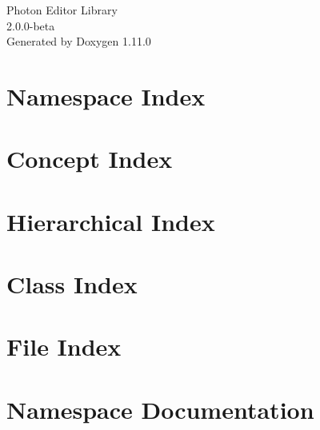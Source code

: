 \documentclass[twoside]{book}
\newcommand{\+}{\discretionary{\mbox{\scriptsize$\hookleftarrow$}}{}{}}
\newcommand{\clearemptydoublepage}{%
    \newpage{\pagestyle{empty}\cleardoublepage}%
  }
\begin{document}
  \raggedbottom
    \hypersetup{pageanchor=false,
                bookmarksnumbered=true,
                pdfencoding=unicode
               }
  \begin{titlepage}
  \vspace*{7cm}
  \begin{center}%
  {\Large Photon Editor Library}\\
  [1ex]\large 2.\+0.\+0-\/beta \\
  \vspace*{1cm}
  {\large Generated by Doxygen 1.11.0}\\
  \end{center}
  \end{titlepage}
  \clearemptydoublepage
  \tableofcontents
  \clearemptydoublepage
  \hypersetup{pageanchor=true}
\chapter{Namespace Index}

\chapter{Concept Index}

\chapter{Hierarchical Index}

\chapter{Class Index}

\chapter{File Index}

\chapter{Namespace Documentation}










\end{document}
